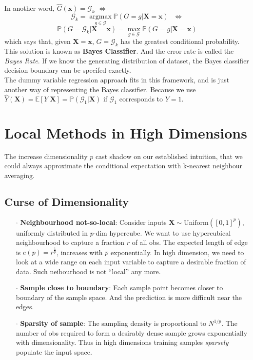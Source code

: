 \documentclass[a4paper, 11pt]{article}
\DeclareMathOperator*{\argmax}{argmax}
\begin{document}
In another word, $\hat{G}(\bm{x})=\mathcal{G}_k$ $\iff$
$$
\mathcal{G}_k = \argmax\limits_{g \in \mathcal{G}} \mathbb{P}\left(G=g|\bm{X}=\bm{x}\right)~~~\iff
$$
$$
\mathbb{P}\left(G=\mathcal{G}_k|\bm{X}=\bm{x}\right) = \max\limits_{g \in \mathcal{G}} \mathbb{P}\left(G=g|\bm{X}=\bm{x}\right)
$$
which says that, given $\bm{X}= \bm{x}$, $G=\mathcal{G}_k$ has the greatest conditional probability. This solution is known as \textbf{Bayes Classifier}. And the error rate is called the \emph{Bayes Rate}. If we know the generating distribution of dataset, the Bayes classifier decision boundary can be specifed exactly.
~\\
The dummy variable regression approach fits in this framework, and is just another way of representing the Bayes classifier. Because we use $\hat{Y}(\bm{X}) = \mathbb{E}\left[Y|\bm{X}\right] = \mathbb{P}\left(\mathcal{G}_1|\bm{X}\right)$ if $\mathcal{G}_1$ corresponds to $Y=1$.








\section{Local Methods in High Dimensions}
The increase dimensionality $p$ cast shadow on our established intuition, that we could always approximate the conditional expectation with k-nearest neighbour averaging.
~\\
\subsection{Curse of Dimensionality}
\begin{itemize}
	\item[$\cdot$] \textbf{Neighbourhood not-so-local}: Consider inputs $\bm{X}\sim \text{Uniform}([0,1]^p)$, uniformly distributed in $p$-dim hypercube. We want to use hypercubical neighbourhood to capture a fraction $r$ of all obs. The expected length of edge is $e(p) = r^{\frac{1}{p}}$, increases with $p$ exponentially. In high dimension, we need to look at a wide range on each input variable to capture a desirable fraction of data. Such neibourhood is not ``local'' any more.
	\item[$\cdot$] \textbf{Sample close to boundary}: Each sample point becomes closer to boundary of the sample space. And the prediction is more difficult near the edges. 
	\item[$\cdot$] \textbf{Sparsity of sample}: The sampling density is proportional to $N^{1/p}$. The number of obs required to form a desirably dense sample grows exponentially with dimensionality. Thus in high dimensions training samples \emph{sparsely} populate the input space.
\end{itemize}
\end{document}

